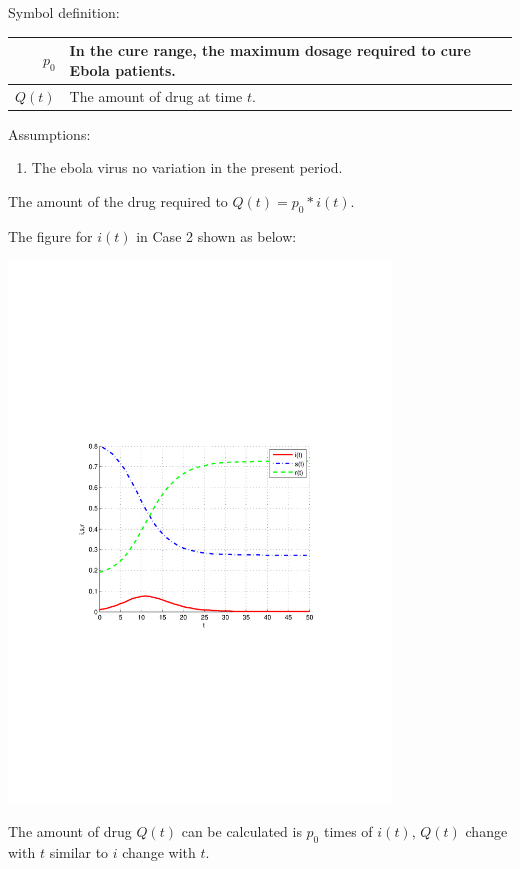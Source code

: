 Symbol definition:
\begin{center}
\begin{tabular}{|r|p{8cm}|}
\hline
$ p_0 $ & In the cure range, the maximum dosage required to
cure Ebola patients.\\
\hline
$ Q(t) $ & The amount of drug at time $t$.\\
\hline
\end{tabular}
\end{center}%
Assumptions:
\begin{enumerate}
  \item The ebola virus no variation in the present period.
\end{enumerate}
The amount of the drug required to $ Q(t)=p_0*i(t) $.\par
The figure for $ i(t) $ in Case 2 shown as below:
\begin{center}
\includegraphics[width=4in]{imgs/sars3_1.pdf}
\end{center}
The amount of drug $Q(t)$ can be calculated is $p_0$ times of
$i(t)$, $Q(t)$ change with $t$ similar to $i$ change with $t$.
